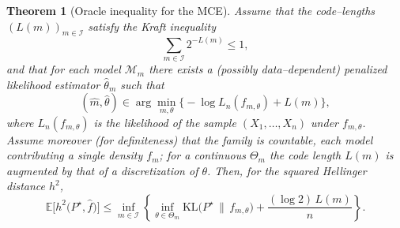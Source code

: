 \documentclass[12pt]{article}
\newtheorem{theorem}{Theorem}[section]
\numberwithin{equation}{section}
\begin{document}
	\begin{theorem}[Oracle inequality for the MCE]
		\label{thm:oracle-proof}
		Assume that the code--lengths $(L(m))_{m\in\mathcal{I}}$ satisfy the Kraft
		inequality
		\begin{equation}
			\label{eq:kraft}
			\sum_{m\in\mathcal{I}} 2^{-L(m)} \le 1,
		\end{equation}
		and that for each model $\mathcal{M}_m$ there exists a (possibly
		data--dependent) penalized likelihood estimator $\widehat{\theta}_m$
		such that
		\begin{equation}
			\label{eq:def-mce}
			(\widehat{m},\widehat{\theta})
			\in \arg\min_{m,\theta}
			\Big\{-\log L_n(f_{m,\theta}) + L(m)\Big\},
		\end{equation}
		where $L_n(f_{m,\theta})$ is the likelihood of the sample
		$(X_1,\ldots,X_n)$ under $f_{m,\theta}$. Assume moreover (for definiteness)
		that the family is countable, each model contributing a single density
		$f_m$; for a continuous $\Theta_m$ the code length $L(m)$ is augmented by
		that of a discretization of $\theta$.
		Then, for the squared Hellinger distance $h^2$,
		\begin{equation}
			\label{eq:oracle-ineq}
			\mathbb{E}\Big[
			h^2\!\big(P^{\star},\widehat{f}\big)
			\Big]
			\le \inf_{m\in\mathcal{I}}
			\left\{
			\inf_{\theta\in\Theta_m}
			\mathrm{KL}\!\big(P^{\star}\,\|\,f_{m,\theta}\big)
			+ \frac{(\log 2)\,L(m)}{n}
			\right\}.
		\end{equation}
	\end{theorem}
	
\end{document}

